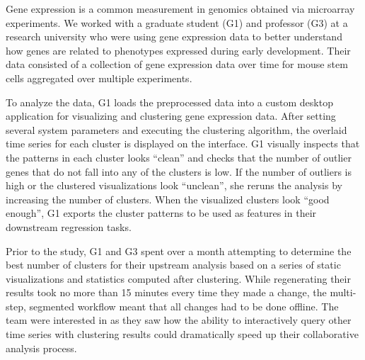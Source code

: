 \par\noindent{} Gene expression is a common measurement in genomics obtained via microarray experiments.  We worked with a graduate student (G1) and professor (G3) at a research university who were using gene expression data to better understand how genes are related to phenotypes expressed during early development. Their data consisted of a collection of gene expression data over time for mouse stem cells aggregated over multiple experiments. %
\par To analyze the data, G1 loads the preprocessed data into a custom desktop application for visualizing and clustering gene expression data. After setting several system parameters and executing the clustering algorithm, the overlaid time series for each cluster is displayed on the interface. G1 visually inspects that the patterns in each cluster looks ``clean'' and checks that the number of outlier genes that do not fall into any of the clusters is low.  If the number of outliers is high or the clustered visualizations look ``unclean'', she reruns the analysis by increasing the number of clusters. When the visualized clusters look ``good enough'', G1 exports the cluster patterns to be used as features in their downstream regression tasks.
\par Prior to the study, G1 and G3 spent over a month attempting to determine the best number of clusters for their upstream analysis based on a series of static visualizations and statistics computed after clustering. While regenerating their results took no more than 15 minutes every time they made a change, the multi-step, segmented workflow meant that all changes had to be done offline. The team were interested in \zv as they saw how the ability to interactively query other time series with clustering results could dramatically speed up their collaborative analysis process.
